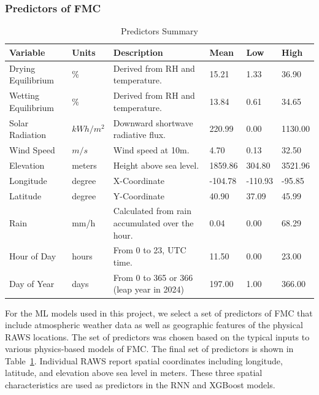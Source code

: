 \documentclass[fire,article,submit,pdftex,moreauthors]{Definitions/mdpi}
\begin{document}
\subsubsection{Predictors of FMC}
\label{sec:preds}
\begin{table}[tb]
\caption{Predictors Summary\label{tab:all_vars}}
\small
\begin{tabularx}{\textwidth}{l l p{4cm} p{1cm} p{1cm} p{1cm}}
\toprule
\textbf{Variable} & \textbf{Units} & \textbf{Description} & \textbf{Mean} & \textbf{Low} & \textbf{High} \\
\midrule
Drying Equilibrium & $\%$ & Derived from RH and temperature. & 15.21 & 1.33 & 36.90 \\
\midrule
Wetting Equilibrium & $\%$ & Derived from RH and temperature. & 13.84 & 0.61 & 34.65 \\
\midrule
Solar Radiation & $kWh/m^2$ & Downward shortwave radiative flux. & 220.99 & 0.00 & 1130.00 \\
\midrule
Wind Speed & $m/s$ & Wind speed at 10m. & 4.70 & 0.13 & 32.50 \\
\midrule
Elevation & meters & Height above sea level. & 1859.86 & 304.80 & 3521.96 \\
\midrule
Longitude & degree & X-Coordinate & -104.78 & -110.93 & -95.85 \\
\midrule
Latitude & degree & Y-Coordinate & 40.90 & 37.09 & 45.99 \\
\midrule
Rain & mm/h & Calculated from rain accumulated over the hour. & 0.04 & 0.00 & 68.29 \\
\midrule
Hour of Day & hours & From 0 to 23, UTC time. & 11.50 & 0.00 & 23.00 \\
\midrule
Day of Year & days & From 0 to 365 or 366 (leap year in 2024) & 197.00 & 1.00 & 366.00 \\
\bottomrule
\end{tabularx}
\end{table}

For the ML models used in this project, we select a set of predictors of FMC that include atmospheric weather data as well as geographic features of the physical RAWS locations. The set of predictors was chosen based on the typical inputs to various physics-based models of FMC. The final set of predictors is shown in Table~\ref{tab:all_vars}. Individual RAWS report spatial coordinates including longitude, latitude, and elevation above sea level in meters. These three spatial characteristics are used as predictors in the RNN and XGBoost models. 
\end{document}
